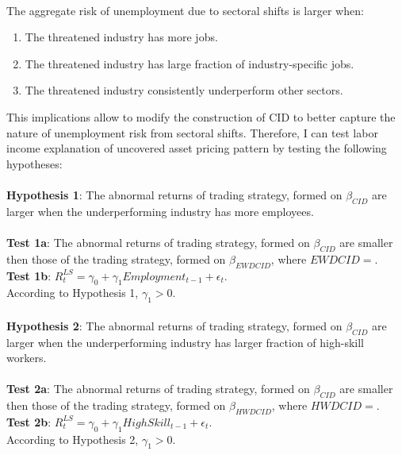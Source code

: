 \documentclass[12pt]{article}
\begin{document}
\paragraph{}
The aggregate risk of unemployment due to sectoral shifts is larger when:
\begin{enumerate}
    \item {The threatened industry has more jobs.}
    \item {The threatened industry has large fraction of industry-specific jobs.}
    \item {The threatened industry consistently underperform other sectors.}
\end{enumerate}
This implications allow to modify the construction of CID to better capture the nature of unemployment risk from sectoral shifts. Therefore, I can test labor income explanation of uncovered asset pricing pattern by testing the following hypotheses:
\paragraph{}
\textbf{Hypothesis 1}: The abnormal returns of trading strategy, formed on $\beta_{CID}$ are larger when the underperforming industry has more employees.
\paragraph{}
\textbf{Test 1a}: The abnormal returns of trading strategy, formed on $\beta_{CID}$ are smaller then those of the trading strategy, formed on $\beta_{EWDCID}$, where $EWDCID=$.
\\ \-\hspace{0.3cm}
\textbf{Test 1b}: $R^{LS}_{t} = \gamma_0 +\gamma_1 Employment_{t-1}+\epsilon_t$. \\ 
According to Hypothesis 1, $\gamma_1>0$.
\paragraph{}
\textbf{Hypothesis 2}: The abnormal returns of trading strategy, formed on $\beta_{CID}$ are larger when the underperforming industry has larger fraction of high-skill workers.
\paragraph{}
\textbf{Test 2a}: The abnormal returns of trading strategy, formed on $\beta_{CID}$ are smaller then those of the trading strategy, formed on $\beta_{HWDCID}$, where $HWDCID=$.
\\ \-\hspace{0.3cm}
\textbf{Test 2b}: $R^{LS}_{t} = \gamma_0 +\gamma_1 HighSkill_{t-1}+\epsilon_t$. \\ 
According to Hypothesis 2, $\gamma_1>0$.
\end{document}
